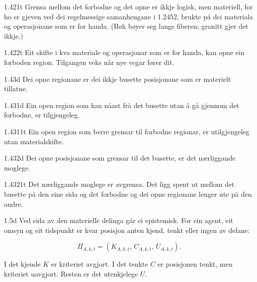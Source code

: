 \begin{formproposition}{1.421}{t}
Grensa mellom det forbodne og det opne er ikkje logisk, men materiell, for ho er gjeven ved dei regelmessige samanhengane i 1.2452, brukte på dei materiala og operasjonane som er for handa. (Bøk bøyer seg langs fiberen; granitt gjer det ikkje.)
\end{formproposition}

\begin{formproposition}{1.422}{t}
Eit skifte i kva materiale og operasjonar som er for handa, kan opne ein forboden region. Tilgangen veks når nye vegar fører dit.
\end{formproposition}

\begin{formproposition}{1.43}{d}
Dei opne regionane er dei ikkje busette posisjonane som er materielt tillatne.
\end{formproposition}

\begin{formproposition}{1.431}{d}
Ein open region som kan nåast frå det busette utan å gå gjennom det forbodne, er tilgjengeleg.
\end{formproposition}

\begin{formproposition}{1.4311}{t}
Ein open region som berre grensar til forbodne regionar, er utilgjengeleg utan materialskifte.
\end{formproposition}

\begin{formproposition}{1.432}{d}
Dei opne posisjonane som grensar til det busette, er det nærliggande moglege.
\end{formproposition}

\begin{formproposition}{1.4321}{t}
Det nærliggande moglege er avgrensa. Det ligg spent ut mellom det busette på den eine sida og det forbodne og dei opne regionane lenger ute på den andre.
\end{formproposition}

\begin{formproposition}{1.5}{d}
Ved sida av den materielle delinga går ei epistemisk. For ein agent, eit omsyn og eit tidspunkt er kvar posisjon anten kjend, tenkt eller ingen av delane:

\[
\Pi_{A,k,t}=(K_{A,k,t},\,C_{A,k,t},\,U_{A,k,t}).
\]

I det kjende \(K\) er kriteriet avgjort. I det tenkte \(C\) er posisjonen tenkt, men kriteriet uavgjort. Resten er det utenkjelege \(U\).
\end{formproposition}

